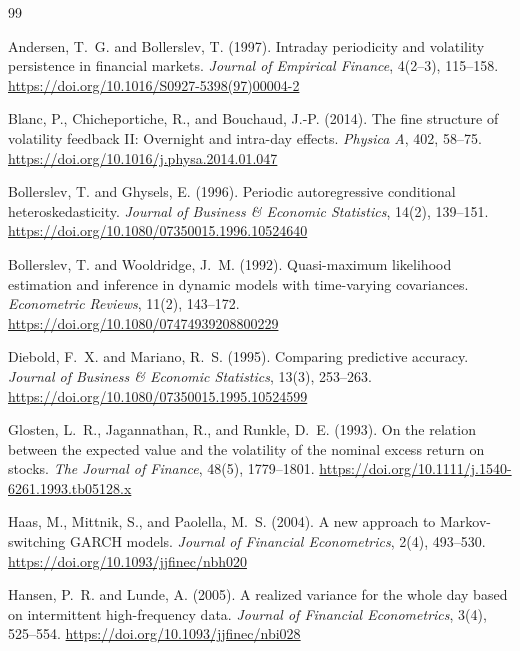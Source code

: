 \documentclass[11pt,a4paper]{article}
\begin{document}
\begin{thebibliography}{99}

Andersen, T.~G. and Bollerslev, T. (1997).
\newblock Intraday periodicity and volatility persistence in financial markets.
\newblock \emph{Journal of Empirical Finance}, 4(2--3), 115--158.
\newblock \url{https://doi.org/10.1016/S0927-5398(97)00004-2}

Blanc, P., Chicheportiche, R., and Bouchaud, J.-P. (2014).
\newblock The fine structure of volatility feedback II: Overnight and intra-day effects.
\newblock \emph{Physica A}, 402, 58--75.
\newblock \url{https://doi.org/10.1016/j.physa.2014.01.047}

Bollerslev, T. and Ghysels, E. (1996).
\newblock Periodic autoregressive conditional heteroskedasticity.
\newblock \emph{Journal of Business \& Economic Statistics}, 14(2), 139--151.
\newblock \url{https://doi.org/10.1080/07350015.1996.10524640}

Bollerslev, T. and Wooldridge, J.~M. (1992).
\newblock Quasi-maximum likelihood estimation and inference in dynamic models with time-varying covariances.
\newblock \emph{Econometric Reviews}, 11(2), 143--172.
\newblock \url{https://doi.org/10.1080/07474939208800229}

Diebold, F.~X. and Mariano, R.~S. (1995).
\newblock Comparing predictive accuracy.
\newblock \emph{Journal of Business \& Economic Statistics}, 13(3), 253--263.
\newblock \url{https://doi.org/10.1080/07350015.1995.10524599}

Glosten, L.~R., Jagannathan, R., and Runkle, D.~E. (1993).
\newblock On the relation between the expected value and the volatility of the nominal excess return on stocks.
\newblock \emph{The Journal of Finance}, 48(5), 1779--1801.
\newblock \url{https://doi.org/10.1111/j.1540-6261.1993.tb05128.x}

Haas, M., Mittnik, S., and Paolella, M.~S. (2004).
\newblock A new approach to Markov-switching GARCH models.
\newblock \emph{Journal of Financial Econometrics}, 2(4), 493--530.
\newblock \url{https://doi.org/10.1093/jjfinec/nbh020}

Hansen, P.~R. and Lunde, A. (2005).
\newblock A realized variance for the whole day based on intermittent high-frequency data.
\newblock \emph{Journal of Financial Econometrics}, 3(4), 525--554.
\newblock \url{https://doi.org/10.1093/jjfinec/nbi028}


\end{thebibliography}
\end{document}
